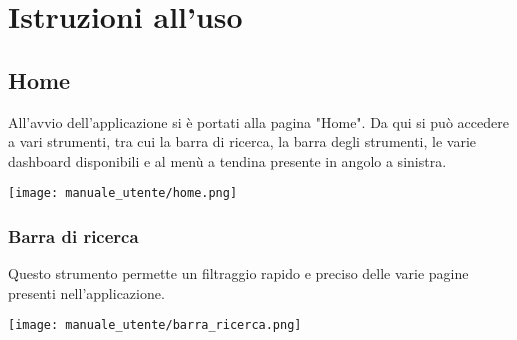 \section{Istruzioni all'uso}
\subsection{Home}
All'avvio dell'applicazione si è portati alla pagina "Home". Da qui si può accedere a vari strumenti, tra cui la barra di ricerca, la barra degli strumenti, le varie dashboard disponibili e al menù a tendina presente in angolo a sinistra.
\begin{center}
    \texttt{[image: manuale\_utente/home.png]}
\end{center}
\newpage
\subsubsection{Barra di ricerca}
Questo strumento permette un filtraggio rapido e preciso delle varie pagine presenti nell'applicazione. 
\begin{center}
    \texttt{[image: manuale\_utente/barra\_ricerca.png]}
\end{center}

